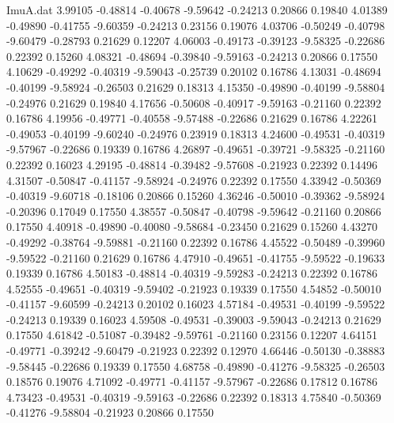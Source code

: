 \begin{filecontents}{ImuA.dat}
   3.99105   -0.48814   -0.40678   -9.59642   -0.24213    0.20866    0.19840
   4.01389   -0.49890   -0.41755   -9.60359   -0.24213    0.23156    0.19076
   4.03706   -0.50249   -0.40798   -9.60479   -0.28793    0.21629    0.12207
   4.06003   -0.49173   -0.39123   -9.58325   -0.22686    0.22392    0.15260
   4.08321   -0.48694   -0.39840   -9.59163   -0.24213    0.20866    0.17550
   4.10629   -0.49292   -0.40319   -9.59043   -0.25739    0.20102    0.16786
   4.13031   -0.48694   -0.40199   -9.58924   -0.26503    0.21629    0.18313
   4.15350   -0.49890   -0.40199   -9.58804   -0.24976    0.21629    0.19840
   4.17656   -0.50608   -0.40917   -9.59163   -0.21160    0.22392    0.16786
   4.19956   -0.49771   -0.40558   -9.57488   -0.22686    0.21629    0.16786
   4.22261   -0.49053   -0.40199   -9.60240   -0.24976    0.23919    0.18313
   4.24600   -0.49531   -0.40319   -9.57967   -0.22686    0.19339    0.16786
   4.26897   -0.49651   -0.39721   -9.58325   -0.21160    0.22392    0.16023
   4.29195   -0.48814   -0.39482   -9.57608   -0.21923    0.22392    0.14496
   4.31507   -0.50847   -0.41157   -9.58924   -0.24976    0.22392    0.17550
   4.33942   -0.50369   -0.40319   -9.60718   -0.18106    0.20866    0.15260
   4.36246   -0.50010   -0.39362   -9.58924   -0.20396    0.17049    0.17550
   4.38557   -0.50847   -0.40798   -9.59642   -0.21160    0.20866    0.17550
   4.40918   -0.49890   -0.40080   -9.58684   -0.23450    0.21629    0.15260
   4.43270   -0.49292   -0.38764   -9.59881   -0.21160    0.22392    0.16786
   4.45522   -0.50489   -0.39960   -9.59522   -0.21160    0.21629    0.16786
   4.47910   -0.49651   -0.41755   -9.59522   -0.19633    0.19339    0.16786
   4.50183   -0.48814   -0.40319   -9.59283   -0.24213    0.22392    0.16786
   4.52555   -0.49651   -0.40319   -9.59402   -0.21923    0.19339    0.17550
   4.54852   -0.50010   -0.41157   -9.60599   -0.24213    0.20102    0.16023
   4.57184   -0.49531   -0.40199   -9.59522   -0.24213    0.19339    0.16023
   4.59508   -0.49531   -0.39003   -9.59043   -0.24213    0.21629    0.17550
   4.61842   -0.51087   -0.39482   -9.59761   -0.21160    0.23156    0.12207
   4.64151   -0.49771   -0.39242   -9.60479   -0.21923    0.22392    0.12970
   4.66446   -0.50130   -0.38883   -9.58445   -0.22686    0.19339    0.17550
   4.68758   -0.49890   -0.41276   -9.58325   -0.26503    0.18576    0.19076
   4.71092   -0.49771   -0.41157   -9.57967   -0.22686    0.17812    0.16786
   4.73423   -0.49531   -0.40319   -9.59163   -0.22686    0.22392    0.18313
   4.75840   -0.50369   -0.41276   -9.58804   -0.21923    0.20866    0.17550

\end{filecontents}
